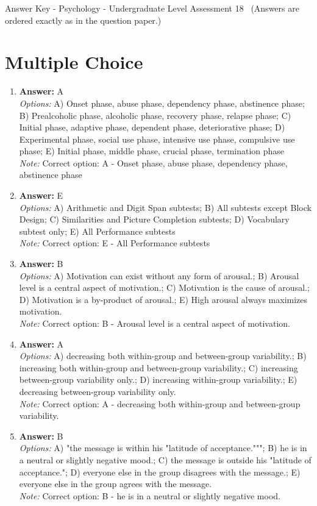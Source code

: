 \documentclass[12pt]{article}
\begin{document}
\begin{center}
Answer Key - Psychology - Undergraduate Level Assessment 18 \
\small (Answers are ordered exactly as in the question paper.)
\end{center}

\section*{Multiple Choice}
\begin{enumerate}[label=\arabic*.]
\item \textbf{Answer:} A
\\ \textit{Options:} A) Onset phase, abuse phase, dependency phase, abstinence phase; B) Prealcoholic phase, alcoholic phase, recovery phase, relapse phase; C) Initial phase, adaptive phase, dependent phase, deteriorative phase; D) Experimental phase, social use phase, intensive use phase, compulsive use phase; E) Initial phase, middle phase, crucial phase, termination phase
\\ \textit{Note:} Correct option: A - Onset phase, abuse phase, dependency phase, abstinence phase
\item \textbf{Answer:} E
\\ \textit{Options:} A) Arithmetic and Digit Span subtests; B) All subtests except Block Design; C) Similarities and Picture Completion subtests; D) Vocabulary subtest only; E) All Performance subtests
\\ \textit{Note:} Correct option: E - All Performance subtests
\item \textbf{Answer:} B
\\ \textit{Options:} A) Motivation can exist without any form of arousal.; B) Arousal level is a central aspect of motivation.; C) Motivation is the cause of arousal.; D) Motivation is a by-product of arousal.; E) High arousal always maximizes motivation.
\\ \textit{Note:} Correct option: B - Arousal level is a central aspect of motivation.
\item \textbf{Answer:} A
\\ \textit{Options:} A) decreasing both within-group and between-group variability.; B) increasing both within-group and between-group variability.; C) increasing between-group variability only.; D) increasing within-group variability.; E) decreasing between-group variability only.
\\ \textit{Note:} Correct option: A - decreasing both within-group and between-group variability.
\item \textbf{Answer:} B
\\ \textit{Options:} A) "the message is within his "latitude of acceptance."""; B) he is in a neutral or slightly negative mood.; C) the message is outside his "latitude of acceptance."; D) everyone else in the group disagrees with the message.; E) everyone else in the group agrees with the message.
\\ \textit{Note:} Correct option: B - he is in a neutral or slightly negative mood.
\end{enumerate}
\end{document}

